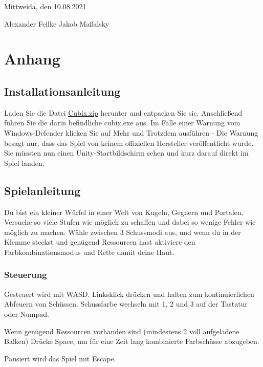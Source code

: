 \documentclass[a4paper,ngerman,12pt]{report}
\begin{document}
Mittweida, den 10.08.2021

\vspace{2cm}

Alexander Feilke \hspace{4cm} Jakob Ma{\ss}alsky





\newpage
\newpage
\chapter{Anhang}




\section{Installationsanleitung}

Laden Sie die Datei \href{https://www.dropbox.com/s/g82vexjznq1x9dd/Cubix.zip?dl=1}{Cubix.zip} herunter und entpacken Sie sie. Anschlie{\ss}end führen Sie die darin befindliche cubix.exe aus.
Im Falle einer Warnung vom Windows-Defender klicken Sie auf Mehr und Trotzdem ausführen - Die Warnung besagt nur, dass das Spiel von keinem offiziellen Hersteller veröffentlicht wurde.
Sie müssten nun einen Unity-Startbildschirm sehen und kurz darauf direkt im Spiel landen.




\section{Spielanleitung}

Du bist ein kleiner Würfel in einer Welt von Kugeln, Gegnern und Portalen. Versuche so viele Stufen wie möglich zu schaffen und dabei so wenige Fehler wie möglich zu machen. Wähle zwischen 3 Schussmodi aus, und wenn du in der Klemme steckst und genügend Ressourcen hast aktiviere den Farbkombinationsmodus und Rette damit deine Haut.



\subsection{Steuerung}

Gesteuert wird mit WASD. Linksklick drücken und halten zum kontinuierlichen Abfeuern von Schüssen. Schussfarbe wechseln mit 1, 2 und 3 auf der Tastatur oder Numpad.

Wenn genügend Ressourcen vorhanden sind (mindestens 2 voll aufgeladene Balken) Drücke Space, um für eine Zeit lang kombinierte Farbschüsse abzugeben.

Pausiert wird das Spiel mit Escape.
\end{document}
